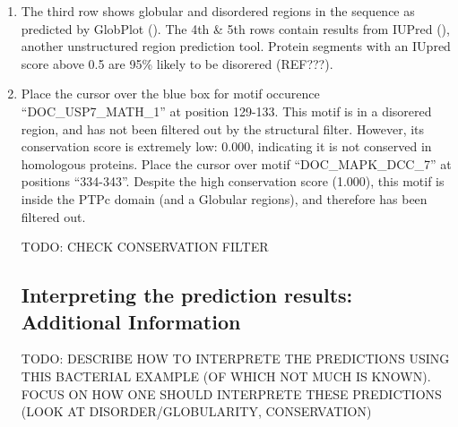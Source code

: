 \begin{enumerate}
\item The third row shows globular and disordered regions in the sequence as
	predicted by GlobPlot (\cite{12824398}). The 4th \& 5th rows contain
	results from IUPred (\cite{15955779}), another unstructured region
	prediction tool. Protein segments with an IUpred score above 0.5 are
	95\% likely to be disorered (REF???).  

\item Place the cursor over the blue box for motif occurence
	``DOC\_USP7\_MATH\_1'' at position 129-133. This motif is in a
	disorered region, and has not been filtered out by the structural
	filter. However, its conservation score is extremely low: 0.000,
	indicating it is not conserved in homologous proteins. Place the cursor
	over motif ``DOC\_MAPK\_DCC\_7'' at positions ``334-343''. Despite the
	high conservation score (1.000), this motif is inside the PTPc domain
	(and a Globular regions), and therefore has been filtered out.

TODO: CHECK CONSERVATION FILTER

%
%
\subsection{Interpreting the prediction results: Additional Information}
\label{subsec:predicting_cv_0974_additional_information}

TODO: DESCRIBE HOW TO INTERPRETE THE PREDICTIONS USING THIS BACTERIAL
EXAMPLE (OF WHICH NOT MUCH IS KNOWN). FOCUS ON HOW ONE SHOULD INTERPRETE
THESE PREDICTIONS (LOOK AT DISORDER/GLOBULARITY, CONSERVATION)

\end{enumerate}
